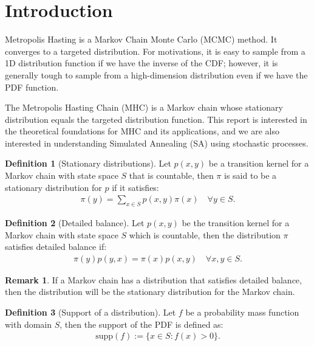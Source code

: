 \documentclass[]{article}
\theoremstyle{definition}
\newtheorem{definition}{Definition}
\newtheorem{remark}{Remark}[subsection]
{
    \newtheorem{assumption}{Assumption}
}
\begin{document}
\section{Introduction}
    Metropolis Hasting is a Markov Chain Monte Carlo (MCMC) method. It converges to a targeted distribution. For motivations, it is easy to sample from a 1D distribution function if we have the inverse of the CDF; however, it is generally tough to sample from a high-dimension distribution even if we have the PDF function. 
    \par
    The Metropolis Hasting Chain (MHC) is a Markov chain whose stationary distribution equals the targeted distribution function. This report is interested in the theoretical foundations for MHC and its applications, and we are also interested in understanding Simulated Annealing (SA) using stochastic processes. 
    \begin{definition}[Stationary distributions]
        Let $p(x, y)$ be a transition kernel for a Markov chain with state space $S$ that is countable, then $\pi$ is said to be a stationary distribution for $p$ if it satisfies: 
        \begin{align*}
            \pi(y) = \sum_{x\in S}p(x, y)\pi(x) \quad \forall y \in S. 
        \end{align*}
    \end{definition}
    \begin{definition}[Detailed balance]
        Let $p(x, y)$ be the transition kernel for a Markov chain with state space $S$ which is countable, then the distribution $\pi$ satisfies detailed balance if: 
        \begin{align*}
            \pi(y)p(y, x) = \pi(x)p(x, y) \quad \forall x, y\in S. 
        \end{align*}
    \end{definition}
    \begin{remark}
        If a Markov chain has a distribution that satisfies detailed balance, then the distribution will be the stationary distribution for the Markov chain. 
    \end{remark}
    \begin{definition}[Support of a distribution]
        Let $f$ be a probability mass function with domain $S$, then the support of the PDF is defined as: 
        \begin{align*}
           \text{supp}(f):= \{x\in S: f(x) > 0\}. 
        \end{align*}
    \end{definition}
    
\end{document}
